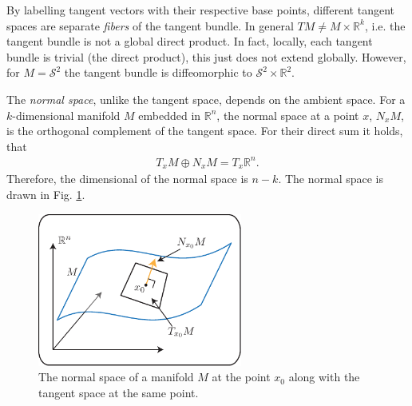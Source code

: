 By labelling tangent vectors with their respective base points, different tangent spaces are separate \emph{fibers} of the tangent bundle. In general $TM \neq M \times \mathbb{R}^{k}$, i.e. the tangent bundle is not a global direct product. In fact, locally, each tangent bundle is trivial (the direct product), this just does not extend globally. However, for $M=\mathcal{S}^{2}$ the tangent bundle is diffeomorphic to $\mathcal{S}^{2} \times \mathbb{R}^{2}$. 

\begin{definition}
	The \emph{normal space}, unlike the tangent space, depends on the ambient space. For a $k$-dimensional manifold $M$ embedded in $\mathbb{R}^{n}$, the normal space at a point $x$, $N_{x}M$, is the orthogonal complement of the tangent space. For their direct sum it holds, that 
	\begin{align}
		\boxed{
			T_{x}M \oplus N_{x}M = T_{x}\mathbb{R}^{n}.
		}
	\end{align}
	Therefore, the dimensional of the normal space is $n-k$. The normal space is drawn in Fig. \ref{fig:normal_space_def}.	
	\begin{figure}[h!]
		\centering
		\includegraphics[width=0.6\textwidth]{figures/ch9/8normal_space_def.pdf}
		\caption{The normal space of a manifold $M$ at the point $x_0$ along with the tangent space at the same point.}
		\label{fig:normal_space_def}
	\end{figure}
\end{definition}

